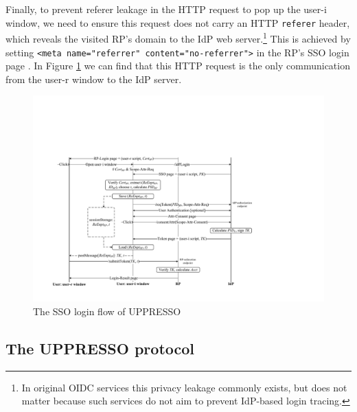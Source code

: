 Finally, to prevent referer leakage in the HTTP request to pop up the user-i window,
 we need to ensure this request does not carry an HTTP \texttt{referer} header, which reveals the visited RP's domain to the IdP web server.\footnote{In original OIDC services this privacy leakage commonly exists, but does not matter because such services do not aim to prevent IdP-based login tracing.} %
%
This is achieved by setting
\verb+<meta name="referrer" content="no-referrer">+
in the RP's SSO login page \cite{referer_policy}.
In Figure \ref{fig:process} we can find that
    this HTTP request is the only communication from the user-r window to the IdP server.

\begin{figure}[htb]
  \centering
  \includegraphics[width=0.76\linewidth]{fig/pop-up-process.pdf}
  \caption{The SSO login flow of UPPRESSO}
  \label{fig:process}
\end{figure}



\subsection{The UPPRESSO protocol}
\label{implementations}

